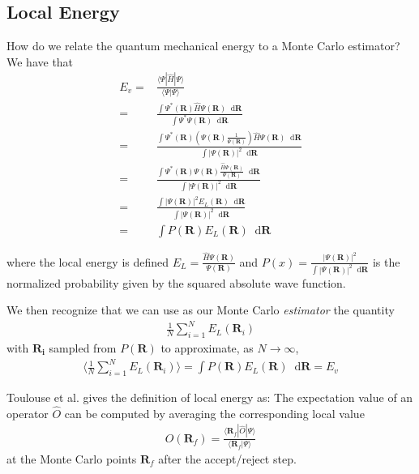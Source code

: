 \documentclass[twoside,english]{uiofysmaster}
\newcommand*\dif{\mathop{}\!\mathrm{d}}
\begin{document}
\subsection{Local Energy}
How do we relate the quantum mechanical energy to a Monte Carlo estimator? We have that \cite{Toulouse2016}
\begin{align}
	E_v =& \frac{\langle \Psi | \hat{H} | \Psi \rangle}{\langle \Psi | \Psi \rangle}  \\
	=& \frac{ \int \Psi^\ast (\bm{R}) \hat{H} \Psi(\bm{R}) \dif \bm{R} }
	{\int \Psi^\ast \Psi(\bm{R}) \dif \bm{R}} \\
	=& \frac{ \int \Psi^\ast (\bm{R}) (\Psi(\bm{R}) \frac{1}{\Psi(\bm{R})}) \hat{H} \Psi(\bm{R}) \dif \bm{R} }
	{\int | \Psi(\bm{R})|^2 \dif \bm{R}} \\
	=&  \frac{ \int \Psi^\ast (\bm{R}) \Psi(\bm{R}) \frac{\hat{H} \Psi(\bm{R}) }{\Psi(\bm{R})}  \dif \bm{R} }
	{\int | \Psi(\bm{R})|^2 \dif \bm{R}} \\
	=&  \frac{ \int | \Psi(\bm{R})|^2  E_L(\bm{R})  \dif \bm{R} }
	{\int | \Psi(\bm{R})|^2 \dif \bm{R}} \\
	=& \int P(\bm{R}) E_L (\bm{R}) \dif \bm{R}
\end{align}

where the local energy is defined $E_L = \frac{\hat{H} \Psi(\bm{R}) }{\Psi(\bm{R})} $ and $P(x) = \frac{| \Psi(\bm{R})|^2 }{ \int | \Psi(\bm{R})|^2 \dif \bm{R} }$ is the normalized probability given by the squared absolute wave function. 

We then recognize that we can use as our Monte Carlo \textit{estimator} the quantity
\begin{align}
	\frac{1}{N} \sum_{i=1}^N E_L(\bm{R}_i)
\end{align}
with $\bm{R_i}$ sampled from $P(\bm{R})$ to approximate, as $N \rightarrow \infty$, 
\begin{align}
	\langle \frac{1}{N} \sum_{i=1}^N E_L(\bm{R}_i) \rangle = \int P(\bm{R}) E_L(\bm{R}) \dif \bm{R} = E_v
\end{align}

Toulouse et al. \cite{Toulouse2016} gives the definition of local energy as: The expectation value of an operator $\hat{O}$ can be computed by averaging the corresponding local value
\begin{align}
	O(\bm{R}_f) = \frac{ \langle \bm{R}_f | \hat{O} |\Psi \rangle }{ \langle \bm{R}_f | \Psi \rangle }
\end{align}
at the Monte Carlo points $\bm{R}_f$ after the accept/reject step.
\end{document}
